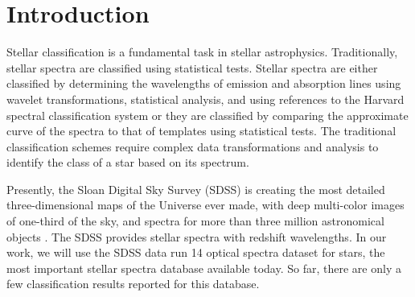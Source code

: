 \documentclass[conference]{IEEEtran}
\begin{document}

\section{Introduction}\label{sec:intro}

Stellar classification is a fundamental task in stellar astrophysics. Traditionally, stellar spectra are classified using statistical
tests. Stellar spectra are either classified by determining the wavelengths of emission and absorption lines using wavelet
transformations, statistical analysis, and using references to the Harvard spectral classification system or they are classified
by comparing the approximate curve of the spectra to that of templates using statistical tests. The traditional classification
schemes require complex data transformations and analysis to identify the class of a star based on its spectrum.

Presently, the Sloan Digital Sky Survey (SDSS) is creating the most detailed three-dimensional maps of the Universe ever
made, with deep multi-color images of one-third of the sky, and spectra for more than three million astronomical objects \cite{sdss}. The SDSS provides stellar spectra with redshift wavelengths.  In our work, we will use the SDSS data run 14 optical spectra dataset for stars, the most important stellar spectra database available today. So far, there are only a few classification results reported for this database.
\end{document}

